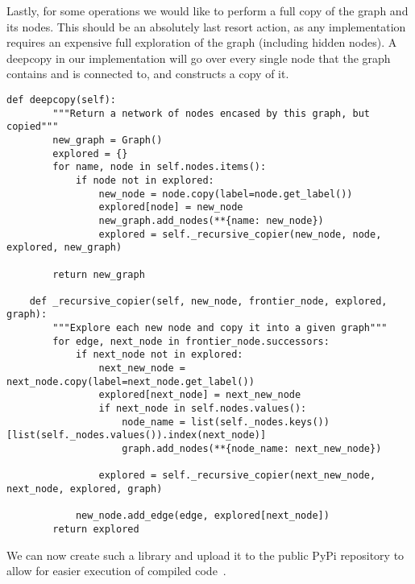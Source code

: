 Lastly, for some operations we would like to perform a full copy of the graph and its nodes.
This should be an absolutely last resort action, as any implementation requires an expensive full exploration of the
graph (including hidden nodes).
A deepcopy in our implementation will go over every single node that the graph contains and is connected to, and
constructs a copy of it.

\begin{lstlisting}[caption={Deep copying a graph},captionpos=b,label={lst:python-deepcopy-graph}]
    def deepcopy(self):
        """Return a network of nodes encased by this graph, but copied"""
        new_graph = Graph()
        explored = {}
        for name, node in self.nodes.items():
            if node not in explored:
                new_node = node.copy(label=node.get_label())
                explored[node] = new_node
                new_graph.add_nodes(**{name: new_node})
                explored = self._recursive_copier(new_node, node, explored, new_graph)

        return new_graph

    def _recursive_copier(self, new_node, frontier_node, explored, graph):
        """Explore each new node and copy it into a given graph"""
        for edge, next_node in frontier_node.successors:
            if next_node not in explored:
                next_new_node = next_node.copy(label=next_node.get_label())
                explored[next_node] = next_new_node
                if next_node in self.nodes.values():
                    node_name = list(self._nodes.keys())[list(self._nodes.values()).index(next_node)]
                    graph.add_nodes(**{node_name: next_new_node})

                explored = self._recursive_copier(next_new_node, next_node, explored, graph)

            new_node.add_edge(edge, explored[next_node])
        return explored
\end{lstlisting}

We can now create such a library and upload it to the public PyPi repository to allow for easier execution of compiled
code~\cite{LatticePyPi}.